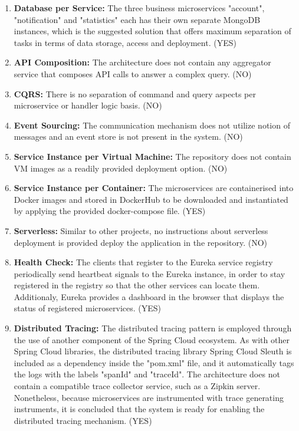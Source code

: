 \documentclass{Configuration_Files/PoliMi3i_thesis}
\begin{document}
\begin{enumerate}
    \item \textbf{Database per Service:} The three business microservices "account", "notification" and "statistics" each has their own separate MongoDB instances, which is the suggested solution that offers maximum separation of tasks in terms of data storage, access and deployment. (YES)
    
    \item \textbf{API Composition:} The architecture does not contain any aggregator service that composes API calls to answer a complex query. (NO)
    
    \item \textbf{CQRS:} There is no separation of command and query aspects per microservice or handler logic basis. (NO)
    
    \item \textbf{Event Sourcing:} The communication mechanism does not utilize notion of messages and an event store is not present in the system. (NO)
    
    \item \textbf{Service Instance per Virtual Machine:} The repository does not contain VM images as a readily provided deployment option. (NO)
    
    \item \textbf{Service Instance per Container:} The microservices are containerised into Docker images and stored in DockerHub to be downloaded and instantiated by applying the provided docker-compose file. (YES)
    
    \item \textbf{Serverless:} Similar to other projects, no instructions about serverless deployment is provided deploy the application in the repository. (NO)
    
    \item \textbf{Health Check:} The clients that register to the Eureka service registry periodically send heartbeat signals to the Eureka instance, in order to stay registered in the registry so that the other services can locate them.
    Additionaly, Eureka provides a dashboard in the browser that displays the status of registered microservices. (YES)
    
    \item \textbf{Distributed Tracing:} The distributed tracing pattern is employed through the use of another component of the Spring Cloud ecosystem.
    As with other Spring Cloud libraries, the distributed tracing library Spring Cloud Sleuth is included as a dependency inside the "pom.xml" file, and it automatically tags the logs with the labels "spanId" and "traceId".
    The architecture does not contain a compatible trace collector service, such as a Zipkin server.
    Nonetheless, because microservices are instrumented with trace generating instruments, it is concluded that the system is ready for enabling the distributed tracing mechanism. (YES)
    

\end{enumerate}
\end{document}
